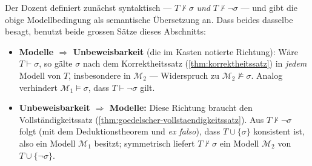 \begin{math-stroke}

\begin{explanation-of-steps}
Der Dozent definiert  zunächst syntaktisch --- $T \nvdash \sigma$ \emph{und} $T \nvdash \neg\sigma$ --- und gibt die obige Modellbedingung als semantische Übersetzung an. Dass beides dasselbe besagt, benutzt beide grossen Sätze dieses Abschnitts:
\begin{itemize}
    \item \textbf{Modelle $\Rightarrow$ Unbeweisbarkeit} (die im Kasten notierte Richtung): Wäre $T \vdash \sigma$, so gälte $\sigma$ nach dem Korrektheitssatz (\cref{thm:korrektheitssatz}) in \emph{jedem} Modell von $T$, insbesondere in $\mathcal{M}_2$ --- Widerspruch zu $\mathcal{M}_2 \not\models \sigma$. Analog verhindert $\mathcal{M}_1 \models \sigma$, dass $T \vdash \neg\sigma$ gilt.
    \item \textbf{Unbeweisbarkeit $\Rightarrow$ Modelle:} Diese Richtung braucht den Vollständigkeitssatz (\cref{thm:goedelscher-vollstaendigkeitssatz}). Aus $T \nvdash \neg\sigma$ folgt (mit dem Deduktionstheorem und \emph{ex falso}), dass $T \cup \{\sigma\}$ konsistent ist, also ein Modell $\mathcal{M}_1$ besitzt; symmetrisch liefert $T \nvdash \sigma$ ein Modell $\mathcal{M}_2$ von $T \cup \{\neg\sigma\}$.
\end{itemize}
\end{explanation-of-steps}

\end{math-stroke}

